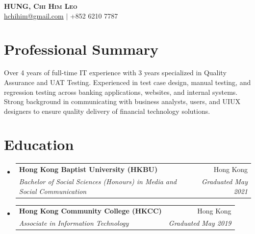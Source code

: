 \documentclass[letterpaper,11pt]{article}
\makeatletter
\newcommand{\resumeSubheading}[4]{
  \vspace{-2pt}\item
    \begin{tabular*}{0.97\textwidth}[t]{l@{\extracolsep{\fill}}r}
      \textbf{#1} & #2 \\
      \textit{\small#3} & \textit{\small #4} \\
    \end{tabular*}\vspace{-7pt}
}
\newcommand{\resumeSubHeadingListStart}{\begin{itemize}[leftmargin=0.15in, label={}]}
\newcommand{\resumeSubHeadingListEnd}{\end{itemize}}
\makeatother
\begin{document}

\begin{center}
    \textbf{\Huge \scshape HUNG, Chi Him Leo} \\ \vspace{3pt}
    \small
    \faAt \hspace{.5pt} \href{mailto:hchihim@gmail.com}{hchihim@gmail.com}
    $|$
    \faPhone \hspace{.5pt} +852 6210 7787
\end{center}




\section{Professional Summary}
  \vspace{2pt}
  \resumeSubHeadingListStart
    \small{\item{
        Over 4 years of full-time IT experience with 3 years specialized in Quality Assurance and UAT Testing. Experienced in test case design, manual testing, and regression testing across banking applications, websites, and internal systems. Strong background in communicating with business analysts, users, and UIUX designers to ensure quality delivery of financial technology solutions.
    }}
  \resumeSubHeadingListEnd




\section{Education}
  \vspace{3pt}
  \resumeSubHeadingListStart

    \resumeSubheading
      {Hong Kong Baptist University (HKBU)}{Hong Kong}
      {Bachelor of Social Sciences (Honours) in Media and Social Communication}{Graduated May 2021}

    \resumeSubheading
      {Hong Kong Community College (HKCC)}{Hong Kong}
      {Associate in Information Technology}{Graduated May 2019}

  \resumeSubHeadingListEnd



\end{document}
